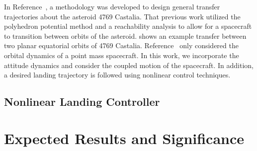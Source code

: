 \documentclass[letterpaper, paper,11pt]{AAS}		%
\begin{document}
In Reference~, a methodology was developed to design general transfer trajectories about the asteroid 4769 Castalia.
That previous work utilized the polyhedron potential method and a reachability analysis to allow for a spacecraft to transition  between orbits of the asteroid.
 shows an example transfer between two planar equatorial orbits of 4769 Castalia.
Reference~ only considered the orbital dynamics of a point mass spacecraft. 
In this work, we incorporate the attitude dynamics and consider the coupled motion of the spacecraft.
In addition, a desired landing trajectory is followed using nonlinear control techniques.
\subsection{Nonlinear Landing Controller}\label{sec:landing}


\section{Expected Results and Significance}\label{sec:expected}

 

\end{document}
